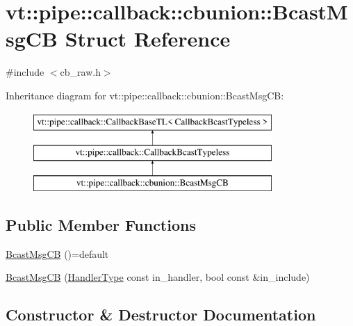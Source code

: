 \hypertarget{structvt_1_1pipe_1_1callback_1_1cbunion_1_1_bcast_msg_c_b}{}\section{vt\+:\+:pipe\+:\+:callback\+:\+:cbunion\+:\+:Bcast\+Msg\+CB Struct Reference}
\label{structvt_1_1pipe_1_1callback_1_1cbunion_1_1_bcast_msg_c_b}


{\ttfamily \#include $<$cb\+\_\+raw.\+h$>$}

Inheritance diagram for vt\+:\+:pipe\+:\+:callback\+:\+:cbunion\+:\+:Bcast\+Msg\+CB\+:\begin{figure}[H]
\begin{center}
\leavevmode
\includegraphics[height=3.000000cm]{structvt_1_1pipe_1_1callback_1_1cbunion_1_1_bcast_msg_c_b}
\end{center}
\end{figure}
\subsection*{Public Member Functions}
\begin{DoxyCompactItemize}
\item 
\hyperlink{structvt_1_1pipe_1_1callback_1_1cbunion_1_1_bcast_msg_c_b_a8fa08a4758e1d59288d60b55230c9fe5}{Bcast\+Msg\+CB} ()=default
\item 
\hyperlink{structvt_1_1pipe_1_1callback_1_1cbunion_1_1_bcast_msg_c_b_a513cd5976cb7fc18d658f71d3fd0a107}{Bcast\+Msg\+CB} (\hyperlink{namespacevt_af64846b57dfcaf104da3ef6967917573}{Handler\+Type} const in\+\_\+handler, bool const \&in\+\_\+include)
\end{DoxyCompactItemize}


\subsection{Constructor \& Destructor Documentation}
\mbox{\label{structvt_1_1pipe_1_1callback_1_1cbunion_1_1_bcast_msg_c_b_a8fa08a4758e1d59288d60b55230c9fe5}} 

